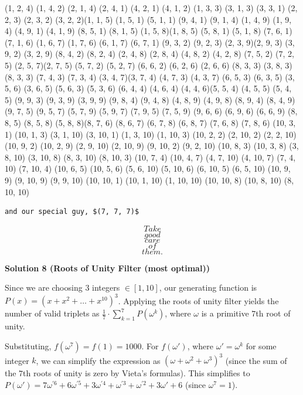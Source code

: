 \begin{enumerate}
 (1, 2, 4) (1, 4, 2) (2, 1, 4) (2, 4, 1) (4, 2, 1) (4, 1, 2) (1, 3, 3) (3, 1, 3) (3, 3, 1) (2, 2, 3) (2, 3, 2) (3, 2, 2)(1, 1, 5) (1, 5, 1) (5, 1, 1) (9, 4, 1) (9, 1, 4) (1, 4, 9) (1, 9, 4) (4, 9, 1) (4, 1, 9) (8, 5, 1) (8, 1, 5) (1, 5, 8)(1, 8, 5) (5, 8, 1) (5, 1, 8) (7, 6, 1) (7, 1, 6) (1, 6, 7) (1, 7, 6) (6, 1, 7) (6, 7, 1) (9, 3, 2) (9, 2, 3) (2, 3, 9)(2, 9, 3) (3, 9, 2) (3, 2, 9) (8, 4, 2) (8, 2, 4) (2, 4, 8) (2, 8, 4) (4, 8, 2) (4, 2, 8) (7, 5, 2) (7, 2, 5) (2, 5, 7)(2, 7, 5) (5, 7, 2) (5, 2, 7) (6, 6, 2) (6, 2, 6) (2, 6, 6) (8, 3, 3) (3, 8, 3) (8, 3, 3) (7, 4, 3) (7, 3, 4) (3, 4, 7)(3, 7, 4) (4, 7, 3) (4, 3, 7) (6, 5, 3) (6, 3, 5) (3, 5, 6) (3, 6, 5) (5, 6, 3) (5, 3, 6) (6, 4, 4) (4, 6, 4) (4, 4, 6)(5, 5, 4) (4, 5, 5) (5, 4, 5) (9, 9, 3) (9, 3, 9) (3, 9, 9) (9, 8, 4) (9, 4, 8) (4, 8, 9) (4, 9, 8) (8, 9, 4) (8, 4, 9)(9, 7, 5) (9, 5, 7) (5, 7, 9) (5, 9, 7) (7, 9, 5) (7, 5, 9) (9, 6, 6) (6, 9, 6) (6, 6, 9) (8, 8, 5) (8, 5, 8) (5, 8, 8)(8, 7, 6) (8, 6, 7) (6, 7, 8) (6, 8, 7) (7, 6, 8) (7, 8, 6) (10, 3, 1) (10, 1, 3) (3, 1, 10) (3, 10, 1) (1, 3, 10) (1, 10, 3) (10, 2, 2) (2, 10, 2) (2, 2, 10) (10, 9, 2) (10, 2, 9) (2, 9, 10) (2, 10, 9) (9, 10, 2) (9, 2, 10) (10, 8, 3) (10, 3, 8) (3, 8, 10) (3, 10, 8) (8, 3, 10) (8, 10, 3) (10, 7, 4) (10, 4, 7) (4, 7, 10) (4, 10, 7) (7, 4, 10) (7, 10, 4) (10, 6, 5) (10, 5, 6) (5, 6, 10) (5, 10, 6) (6, 10, 5) (6, 5, 10) (10, 9, 9) (9, 10, 9) (9, 9, 10) (10, 10, 1) (10, 1, 10) (1, 10, 10) (10, 10, 8) (10, 8, 10) (8, 10, 10)

 \begin{verbatim}
and our special guy, $(7, 7, 7)$
\end{verbatim}


 \[Take\] 
 \[good\] 
 \[care\] 
 \[of\] 
 \[them.\]




\textbf{Solution 8 (Roots of Unity Filter (most optimal))}

Since we are choosing $3$ integers $\in [1,10]$, our generating function is $P(x)=(x+x^2+\dots+x^{10})^3$. Applying the roots of unity filter yields the number of valid triplets as $\frac{1}{7} \cdot \sum_{k=1}^{7} P(\omega^k)$, where $\omega$ is a primitive $7$th root of unity. 

 
Substituting, $f(\omega^7)=f(1)=1000$. For $f(\omega')$, where $\omega'=\omega^k$ for some integer $k$, we can simplify the expression as $(\omega+\omega^2+\omega^3)^3$ (since the sum of the $7$th roots of unity is zero by Vieta's formulas). This simplifies to $P(\omega')=7\omega^{'6}+6\omega^{'5}+3\omega^{'4}+\omega^{'3}+\omega^{'2}+3\omega'+6$ (since $\omega^7=1$). 


\end{enumerate}
